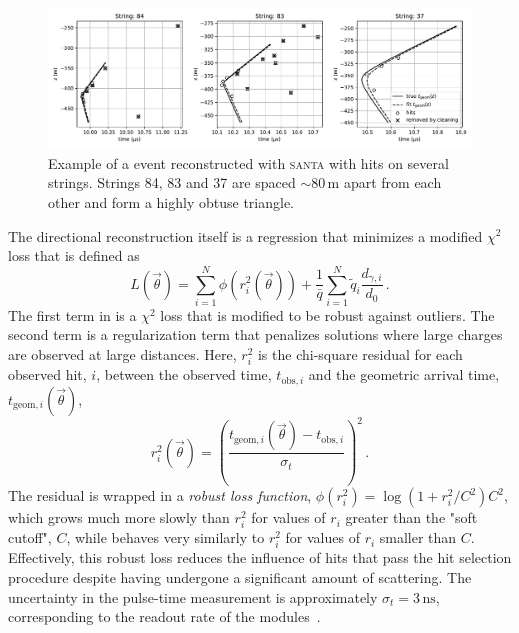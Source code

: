 \begin{figure}
    \centering
    \includegraphics[width=\linewidth]{figures/icecube/reconstruction/santa/multi_string_example_with_cleaning_id_12607962.pdf}
    \caption{Example of a \numucc event reconstructed with \textsc{santa} with hits on several strings. Strings 84, 83 and 37 are spaced $\sim80\,\mathrm{m}$ apart from each other and form a highly obtuse triangle.}
    \label{fig:santa-multi-string-example}
\end{figure}

The directional reconstruction itself is a regression that minimizes a modified $\chi^2$ loss that is defined as
\begin{equation}
L(\vec{\theta})=\sum_{i=1}^{N}\phi(r^2_i(\vec{\theta}))
+
\frac{1}{\bar{q}}\sum_{i=1}^{N}\tilde{q}_i \frac{d_{\gamma,i}}{d_0}\,.\label{eq:chi-square-mod-loss}
\end{equation}
The first term in  is a $\chi^2$ loss that is modified to be robust against outliers. The second term is a regularization term that penalizes solutions where large charges are observed at large distances. Here, $r^2_i$ is the chi-square residual for each observed hit, $i$, between the observed time, $t_{\mathrm{obs}, i}$ and the geometric arrival time, $t_{\mathrm{geom},i}(\vec{\theta})$,
\begin{equation}
r_{i}^{2}(\vec{\theta})=\left(\frac{t_{\mathrm{geom},i}(\vec{\theta})-t_{\mathrm{obs},i}}{\sigma_{t}}\right)^{2}\,.
\end{equation}
The residual is wrapped in a \emph{robust loss function}, $\phi(r_{i}^{2})=\log\left(1+r_{i}^{2}/C^2\right)C^2$, which grows much more slowly than $r_{i}^{2}$ for values of $r_i$ greater than the "soft cutoff", $C$, while behaves very similarly to $r_i^2$ for values of $r_i$ smaller than $C$.
Effectively, this robust loss reduces the influence of hits that pass the hit selection procedure despite having undergone a significant amount of scattering.
The uncertainty in the pulse-time measurement is approximately $\sigma_{t}=3\,\mathrm{ns}$, corresponding to the readout rate of the modules~\cite{icecube_daq}.

